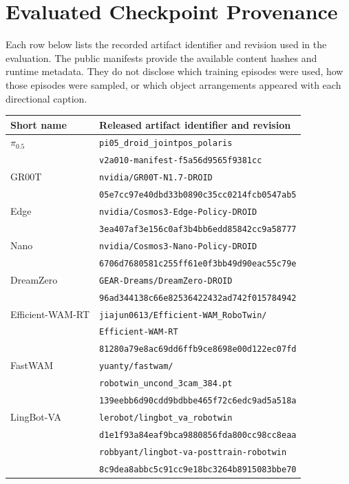\documentclass[letterpaper,10pt,conference]{ieeeconf}%
\begin{document}
\section{Evaluated Checkpoint Provenance}
\label{app:provenance}

Each row below lists the recorded artifact identifier and revision used in the evaluation.
The public manifests provide the available content hashes and runtime metadata.
They do not disclose which training episodes were used, how those episodes were sampled, or which object arrangements appeared with each directional caption.

\begin{center}
  \centering
  \scriptsize
  \setlength{\tabcolsep}{3pt}
  \begin{tabular}{@{}ll@{}}
    \toprule
    Short name & Released artifact identifier and revision \\
    \midrule
    $\pi_{0.5}$ & \texttt{pi05\_droid\_jointpos\_polaris} \\
                & \texttt{v2a010-manifest-f5a56d9565f9381cc} \\
    GR00T & \texttt{nvidia/GR00T-N1.7-DROID} \\
          & \texttt{05e7cc97e40dbd33b0890c35cc0214fcb0547ab5} \\
    Edge & \texttt{nvidia/Cosmos3-Edge-Policy-DROID} \\
         & \texttt{3ea407af3e156c0af3b4bb6edd85842cc9a58777} \\
    Nano & \texttt{nvidia/Cosmos3-Nano-Policy-DROID} \\
         & \texttt{6706d7680581c255ff61e0f3bb49d90eac55c79e} \\
    DreamZero & \texttt{GEAR-Dreams/DreamZero-DROID} \\
              & \texttt{96ad344138c66e82536422432ad742f015784942} \\
    Efficient-WAM-RT & \texttt{jiajun0613/Efficient-WAM\_RoboTwin/} \\
                     & \texttt{Efficient-WAM-RT} \\
                     & \texttt{81280a79e8ac69dd6ffb9ce8698e00d122ec07fd} \\
    FastWAM & \texttt{yuanty/fastwam/} \\
            & \texttt{robotwin\_uncond\_3cam\_384.pt} \\
            & \texttt{139eebb6d90cdd9bdbbe465f72c6edc9ad5a518a} \\
    LingBot-VA & \texttt{lerobot/lingbot\_va\_robotwin} \\
               & \texttt{d1e1f93a84eaf9bca9880856fda800cc98cc8eaa} \\
               & \texttt{robbyant/lingbot-va-posttrain-robotwin} \\
               & \texttt{8c9dea8abbc5c91cc9e18bc3264b8915083bbe70} \\
    \bottomrule
  \end{tabular}
\end{center}
\end{document}
